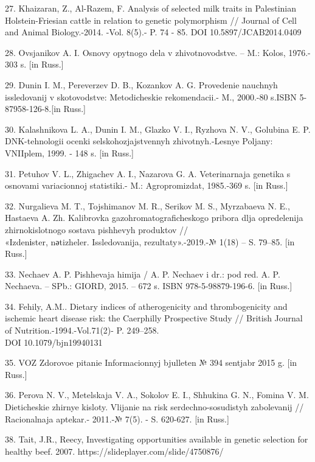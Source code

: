 \begin{noparindent}
27. Khaizaran, Z., Al-Razem, F. Analysis of selected milk traits in
Palestinian Holstein-Friesian cattle in relation to genetic polymorphism
// Journal of Cell and Animal Biology.-2014. -Vol. 8(5).- P. 74 - 85.
DOI 10.5897/JCAB2014.0409

28. Ovsjanikov A. I. Osnovy opytnogo dela v zhivotnovodstve. -- M.:
Kolos, 1976.- 303 s. {[}in Russ.{]}

29. Dunin I. M., Pereverzev D. B., Kozankov A. G. Provedenie nauchnyh
issledovanij v skotovodstve: Metodicheskie rekomendacii.- M., 2000.-80
s.ISBN 5-87958-126-8.{[}in Russ.{]}

30. Kalashnikova L. A., Dunin I. M., Glazko V. I., Ryzhova N. V.,
Golubina E. P. DNK-tehnologii ocenki
sel\textquotesingle skohozjajstvennyh zhivotnyh.-Lesnye Poljany:
VNIIplem, 1999. - 148 s. {[}in Russ.{]}

31. Petuhov V. L., Zhigachev A. I., Nazarova G. A. Veterinarnaja
genetika s osnovami variacionnoj statistiki.- M.: Agropromizdat,
1985.-369 s. {[}in Russ.{]}

32. Nurgalieva M. T., Tojshimanov M. R., Serikov M. S., Myrzabaeva N.
E., Hastaeva A. Zh. Kalibrovka gazohromatograficheskogo pribora dlja
opredelenija zhirnokislotnogo sostava pishhevyh produktov //
\\«Іzdenіster, nәtizheler. Issledovanija,
rezul\textquotesingle taty».-2019.-№ 1(18) -- S. 79--85. {[}in Russ.{]}

33. Nechaev A. P. Pishhevaja himija / A. P. Nechaev i dr.: pod red. A.
P. Nechaeva. -- SPb.: GIORD, 2015. -- 672 s. ISBN 978-5-98879-196-6.
{[}in Russ.{]}

34. Fehily, A.M.. Dietary indices of atherogenicity and thrombogenicity
and ischemic heart disease risk: the Caerphilly Prospective Study //
British Journal of Nutrition.-1994.-Vol.71(2)- P. 249--258. \\DOI
10.1079/bjn19940131

35. VOZ Zdorovoe pitanie Informacionnyj bjulleten\textquotesingle{} №
394 sentjabr\textquotesingle{} 2015 g. {[}in Russ.{]}

36. Perova N. V., Metel\textquotesingle skaja V. A., Sokolov E. I.,
Shhukina G. N., Fomina V. M. Dieticheskie zhirnye kisloty. Vlijanie na
risk serdechno-sosudistyh zabolevanij // Racional\textquotesingle naja
aptekar\textquotesingle.- 2011.-№ 7(5). - S. 620-627. {[}in Russ.{]}

38. Tait, J.R., Reecy, Investigating opportunities available in genetic
selection for healthy beef. 2007. https://slideplayer.com/slide/4750876/


\end{noparindent}
